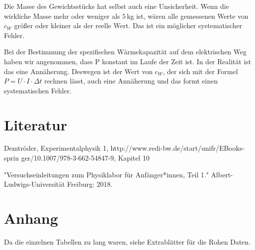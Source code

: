 \documentclass[11pt,a4paper]{article} %
\begin{document}
Die Masse des Gewichtsstücks hat selbst auch eine Unsicherheit. Wenn die wirkliche Masse mehr oder weniger als $5\,$kg ist, wären alle gemessenen Werte von $c_W$ gr\"o\ss er oder kleiner als der reelle Wert.
Das ist ein möglicher systematischer Fehler.

Bei der Bestimmung der spezifischen Wärmekapazität auf dem elektrischen Weg haben wir angenommen, dass P konstant im Laufe der Zeit ist. In der Realität ist das eine Annäherung. Deswegen ist der Wert von $c_W$, der sich mit der Formel 
$P=U \cdot I \cdot \Delta t $ rechnen l\"asst, auch eine Annäherung und das formt einen systematischen Fehler.


\section{ Literatur}
	Demtröder, Experimentalphysik 1, http://www.redi-bw.de/start/unifr/EBooks-sprin
	ger/10.1007/978-3-662-54847-9, Kapitel 10
	
	"Versuchseinleitungen zum Physiklabor für Anfänger*innen, Teil 1." Albert-Ludwigs-Universität Freiburg: 2018. 
    
\section{Anhang}
 Da die einzelnen Tabellen zu lang waren, siehe Extrablätter für die Rohen Daten. 
\end{document}
